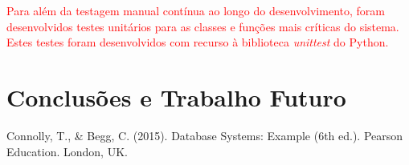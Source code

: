 \documentclass[a4paper,12pt]{scrreprt}
\begin{document}
\textcolor{red}{
    Para além da testagem manual contínua ao longo do desenvolvimento, foram
    desenvolvidos testes unitários para as classes e funções mais críticas do
    sistema. Estes testes foram desenvolvidos com recurso à biblioteca
    \textit{unittest} do Python.
}



\chapter{Conclusões e Trabalho Futuro}



\renewcommand\bibname{Referências}

\begin{thebibliography}{9}

Connolly, T., \& Begg, C. (2015). Database Systems: Example (6th ed.). Pearson Education. London, UK.


\end{thebibliography}






\end{document}
